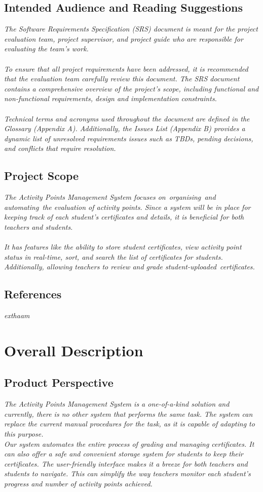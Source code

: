 \documentclass{article}
\begin{document}
\subsection{Intended Audience and Reading Suggestions}
\emph{The Software Requirements Specification (SRS) document is meant for the project evaluation team, project supervisor, and project guide who are responsible for evaluating the team's work.\\
 \\
 To ensure that all project requirements have been addressed, it is recommended that the evaluation team carefully review this document. The SRS document contains a comprehensive overview of the project's scope, including functional and non-functional requirements, design and implementation constraints. \\
 \\
 Technical terms and acronyms used throughout the document are defined in the Glossary (Appendix A). Additionally, the Issues List (Appendix B) provides a dynamic list of unresolved requirements issues such as TBDs, pending decisions, and conflicts that require resolution.
}
\subsection{Project Scope}
\emph{
The Activity Points Management System focuses on organising and automating the evaluation of activity points. Since a system will be in place for keeping track of each student's certificates and details, it is beneficial for both teachers and students. \\
\\
It has features like the ability to store student certificates, view activity point status in real-time, sort, and search the list of certificates for students. Additionally, allowing teachers to review and grade student-uploaded certificates.\\
}
\subsection{References}
\emph{exthaam }
\section{Overall Description}
\subsection{Product Perspective}
\emph{The Activity Points Management System is a one-of-a-kind solution and currently, there is no other system that performs the same task. The system can replace the current manual procedures for the task, as it is capable of adapting to this purpose.\\
Our system automates the entire process of grading and managing certificates. It can also offer a safe and convenient storage system for students to keep their certificates. The user-friendly interface makes it a breeze for both teachers and students to navigate. This can simplify the way teachers monitor each student's progress and number of activity points achieved.\\
}
\end{document}
